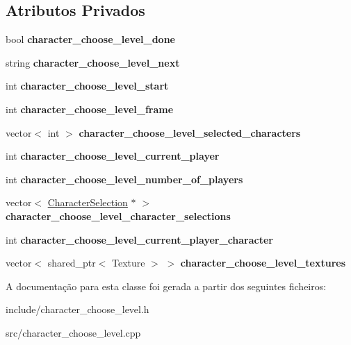 \subsection*{Atributos Privados}
\begin{DoxyCompactItemize}
\item 
\mbox{\label{classCharacterChooseLevel_adf70304df201b570b5be8cebe8c438f8}} 
bool {\bfseries character\+\_\+choose\+\_\+level\+\_\+done}
\item 
\mbox{\label{classCharacterChooseLevel_a16441ab2ee7e4596a94109f1d477411d}} 
string {\bfseries character\+\_\+choose\+\_\+level\+\_\+next}
\item 
\mbox{\label{classCharacterChooseLevel_abe71bb4468b8fd8aa46f65a51e6323ef}} 
int {\bfseries character\+\_\+choose\+\_\+level\+\_\+start}
\item 
\mbox{\label{classCharacterChooseLevel_a17fab0256229c4d380e802b44331f095}} 
int {\bfseries character\+\_\+choose\+\_\+level\+\_\+frame}
\item 
\mbox{\label{classCharacterChooseLevel_a3f5f82824867d0bac6fc379acbf40910}} 
vector$<$ int $>$ {\bfseries character\+\_\+choose\+\_\+level\+\_\+selected\+\_\+characters}
\item 
\mbox{\label{classCharacterChooseLevel_af2366120c236a7c1b5b4077e6a1b29ab}} 
int {\bfseries character\+\_\+choose\+\_\+level\+\_\+current\+\_\+player}
\item 
\mbox{\label{classCharacterChooseLevel_a5fa43a1808568de8a7f0fad0f089b55f}} 
int {\bfseries character\+\_\+choose\+\_\+level\+\_\+number\+\_\+of\+\_\+players}
\item 
\mbox{\label{classCharacterChooseLevel_a64c60f4f79d8a00253a98464eb828323}} 
vector$<$ \mbox{\hyperlink{classCharacterSelection}{Character\+Selection}} $\ast$ $>$ {\bfseries character\+\_\+choose\+\_\+level\+\_\+character\+\_\+selections}
\item 
\mbox{\label{classCharacterChooseLevel_a5ff1d679ef4ef8bb465f9a3a030a5ee0}} 
int {\bfseries character\+\_\+choose\+\_\+level\+\_\+current\+\_\+player\+\_\+character}
\item 
\mbox{\label{classCharacterChooseLevel_a9ee1b2d4c52e61d3a67d1abdd0d25071}} 
vector$<$ shared\+\_\+ptr$<$ Texture $>$ $>$ {\bfseries character\+\_\+choose\+\_\+level\+\_\+textures}
\end{DoxyCompactItemize}


A documentação para esta classe foi gerada a partir dos seguintes ficheiros\+:\begin{DoxyCompactItemize}
\item 
include/character\+\_\+choose\+\_\+level.\+h\item 
src/character\+\_\+choose\+\_\+level.\+cpp\end{DoxyCompactItemize}

